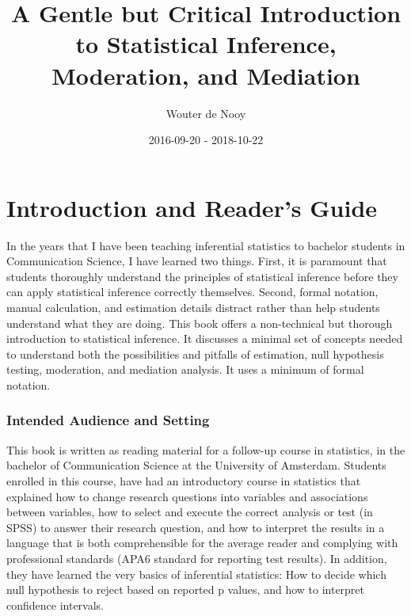 \documentclass[a4paper]{book}
\title{A Gentle but Critical Introduction to Statistical Inference, Moderation,
and Mediation}
\author{Wouter de Nooy}
\date{2016-09-20 - 2018-10-22}
\theoremstyle{definition}
\theoremstyle{definition}
\theoremstyle{definition}
\theoremstyle{remark}
\begin{document}
\maketitle

\listoffigures 
\listoftables

{
\setcounter{tocdepth}{2}
\tableofcontents
}
\chapter*{Introduction and Reader's
Guide}\label{introduction-and-readers-guide}

In the years that I have been teaching inferential statistics to
bachelor students in Communication Science, I have learned two things.
First, it is paramount that students thoroughly understand the
principles of statistical inference before they can apply statistical
inference correctly themselves. Second, formal notation, manual
calculation, and estimation details distract rather than help students
understand what they are doing. This book offers a non-technical but
thorough introduction to statistical inference. It discusses a minimal
set of concepts needed to understand both the possibilities and pitfalls
of estimation, null hypothesis testing, moderation, and mediation
analysis. It uses a minimum of formal notation.

\subsection*{Intended Audience and
Setting}\label{intended-audience-and-setting}

This book is written as reading material for a follow-up course in
statistics, in the bachelor of Communication Science at the University
of Amsterdam. Students enrolled in this course, have had an introductory
course in statistics that explained how to change research questions
into variables and associations between variables, how to select and
execute the correct analysis or test (in SPSS) to answer their research
question, and how to interpret the results in a language that is both
comprehensible for the average reader and complying with professional
standards (APA6 standard for reporting test results). In addition, they
have learned the very basics of inferential statistics: How to decide
which null hypothesis to reject based on reported p values, and how to
interpret confidence intervals.
\end{document}
